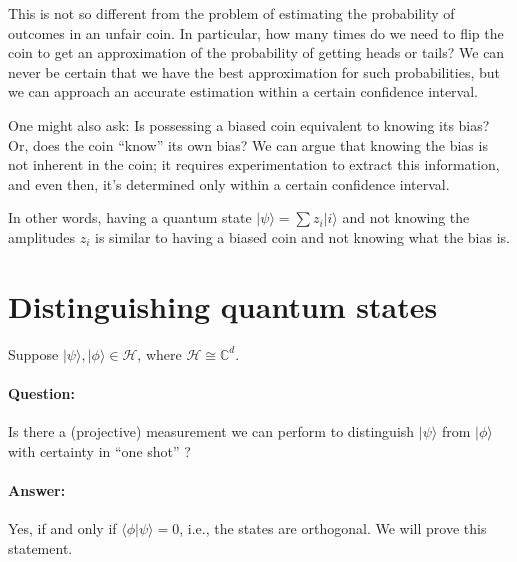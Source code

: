 \documentclass{article}
\newcommand{\ket}[1]{|#1\rangle}
\newcommand{\braket}[2]{\langle#1|#2\rangle}
\begin{document}
This is not so different from the problem of estimating
the probability of outcomes in an unfair coin.
In particular, how many times do we need to flip the coin
to get an approximation of the probability of getting heads or tails?
We can never be certain that we have the best approximation 
for such probabilities, but we can approach an accurate 
estimation within a certain confidence interval.

One might also ask: Is possessing a biased coin equivalent 
to knowing its bias? Or, does the coin ``know'' its own bias? 
We can argue that knowing the bias is not inherent 
in the coin; it requires experimentation to extract this 
information, and even then, it's determined 
only within a certain confidence interval.

In other words, having a quantum state $\ket \psi = \sum z_i \ket i$ 
and not knowing the amplitudes $z_i$ is similar to having 
a biased coin and not knowing what the bias is.

\section{Distinguishing quantum states}
Suppose $\ket \psi, \ket \phi \in \mathcal H$, where $\mathcal H \cong \mathbb C^d$.

\paragraph{Question:} 
Is there a (projective) measurement we can perform to distinguish $\ket \psi$
from $\ket \phi$ with certainty in ``one shot'' ?

\paragraph{Answer:}
Yes, if and only if $\braket{\phi}{\psi} = 0$, i.e.,
the states are orthogonal. We will prove this statement.
\end{document}
